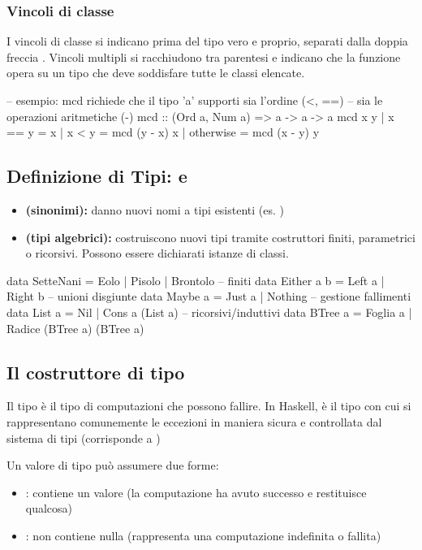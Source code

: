 \subsubsection{Vincoli di classe}
I vincoli di classe si indicano prima del tipo vero e proprio, separati dalla doppia freccia \code{=>}. Vincoli multipli si racchiudono tra parentesi e indicano che la funzione opera su un tipo che deve soddisfare tutte le classi elencate.

\begin{haskellbox}{}
-- esempio: mcd richiede che il tipo 'a' supporti sia l'ordine (<, ==) 
-- sia le operazioni aritmetiche (-)
mcd :: (Ord a, Num a) => a -> a -> a
mcd x y
  | x == y    = x
  | x < y     = mcd (y - x) x
  | otherwise = mcd (x - y) y
\end{haskellbox}

\subsection{Definizione di Tipi:  e }
\begin{itemize}
    \item \textbf{ (sinonimi):} danno nuovi nomi a tipi esistenti (es. )   
    \item \textbf{ (tipi algebrici):} costruiscono nuovi tipi tramite costruttori finiti, parametrici o ricorsivi. Possono essere dichiarati istanze di classi.
\end{itemize}

\begin{haskellbox}{}
data SetteNani = Eolo | Pisolo | Brontolo          -- finiti
data Either a b = Left a | Right b                 -- unioni disgiunte
data Maybe a = Just a | Nothing                    -- gestione fallimenti
data List a = Nil | Cons a (List a)                -- ricorsivi/induttivi
data BTree a = Foglia a | Radice (BTree a) (BTree a)
\end{haskellbox}
\subsection{Il costruttore di tipo }
Il tipo  è il tipo di computazioni che possono fallire. In Haskell, è il tipo con cui si rappresentano comunemente le eccezioni in maniera sicura e controllata dal sistema di tipi (corrisponde a )

Un valore di tipo  può assumere due forme:
\begin{itemize}
    \item {}: contiene un valore  (la computazione ha avuto successo e restituisce qualcosa)
    \item {}: non contiene nulla (rappresenta una computazione indefinita o fallita)
\end{itemize}

